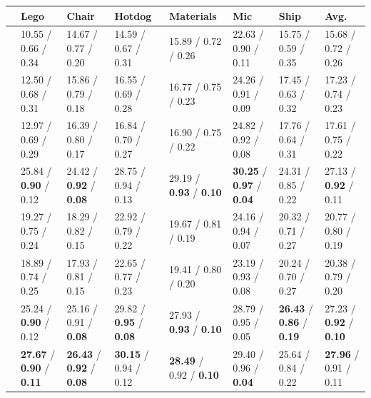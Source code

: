\begin{table}[!ht]
   \scriptsize
   \centering
   \renewcommand{\arraystretch}{1.2} 
   \begin{tabular}{@{}P{0.23\textwidth}P{0.09 \textwidth}P{0.09 \textwidth}P{0.09 \textwidth}P{0.09 \textwidth}P{0.09 \textwidth}P{0.09 \textwidth}P{0.09 \textwidth}@{}}
   \toprule
    &
   Lego & Chair & Hotdog & Materials & Mic & Ship & Avg.\\
   \midrule
    & 10.55 / 0.66 / 0.34 & 14.67 / 0.77 / 0.20 & 14.59 / 0.67 / 0.31 & 15.89 / 0.72 / 0.26 & 22.63 / 0.90 / 0.11 & 15.75 / 0.59 / 0.35 & 15.68 / 0.72 / 0.26\\
    & 12.50 / 0.68 / 0.31 & 15.86 / 0.79 / 0.18 & 16.55 / 0.69 / 0.28 & 16.77 / 0.75 / 0.23 & 24.26 / 0.91 / 0.09 & 17.45 / 0.63 / 0.32 & 17.23 / 0.74 / 0.23 \\
    & 12.97 / 0.69 / 0.29 & 16.39 / 0.80 / 0.17 & 16.84 / 0.70 / 0.27 & 16.90 / 0.75 / 0.22 & 24.82 / 0.92 / 0.08 & 17.76 / 0.64 / 0.31 & 17.61 / 0.75 / 0.22 \\
    & 25.84 / \textbf{0.90} / 0.12 & 24.42 / \textbf{0.92} / \textbf{0.08} & 28.75 / 0.94 / 0.13 & 29.19 / \textbf{0.93} / \textbf{0.10} & \textbf{30.25} / \textbf{0.97} / \textbf{0.04} & 24.31 / 0.85 / 0.22 & 27.13 / \textbf{0.92} / 0.11 \\
    & 19.27 / 0.75 / 0.24 & 18.29 / 0.82 / 0.15 & 22.92 / 0.79 / 0.22 & 19.67 / 0.81 / 0.19 & 24.16 / 0.94 / 0.07 & 20.32 / 0.71 / 0.27 & 20.77 / 0.80 / 0.19 \\
    & 18.89 / 0.74 / 0.25 & 17.93 / 0.81 / 0.15 & 22.65 / 0.77 / 0.23 & 19.41 / 0.80 / 0.20 & 23.19 / 0.93 / 0.08 & 20.24 / 0.70 / 0.27 & 20.38 / 0.79 / 0.20 \\
   \midrule
    & 25.24 / \textbf{0.90} / 0.12 & 25.16 / 0.91 / \textbf{0.08} & 29.82 / \textbf{0.95} / \textbf{0.08} & 27.93 / \textbf{0.93} / \textbf{0.10} & 28.79 / 0.95 / 0.05 & \textbf{26.43} / \textbf{0.86} / \textbf{0.19} & 27.23 / \textbf{0.92} / \textbf{0.10} \\
    & \textbf{27.67} / \textbf{0.90} / \textbf{0.11} & \textbf{26.43} / \textbf{0.92} / \textbf{0.08} & \textbf{30.15} / 0.94 / 0.12 & \textbf{28.49} / 0.92 / \textbf{0.10} & 29.40 / 0.96 / \textbf{0.04} & 25.64 / 0.84 / 0.22 & \textbf{27.96} / 0.91 / 0.11 \\

\end{tabular}
\end{table}
